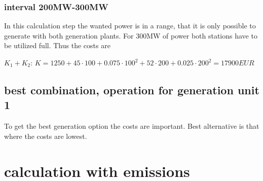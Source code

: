 \documentclass{article}
\begin{document}
	\subsubsection{interval 200MW-300MW}
In this calculation step the wanted power is in a range, that it is only possible to generate with both generation plants. For 300MW of power both stations have to be utilized full. Thus the costs are
	\begin{itemize}
		$K_1+K_2$: $K=1250+45\cdot 100+0.075\cdot 100^2 + 52\cdot 200+0.025\cdot 200^2=17900EUR$
	\end{itemize}
	\subsection{best combination, operation for generation unit 1}
		To get the best generation option the costs are important. Best alternative is that where the costs are lowest.
		\begin{itemize}

		\end{itemize}
		
	\section{calculation with emissions}
\end{document}

